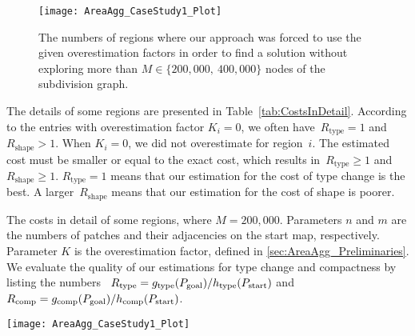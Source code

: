 \begin{figure}[tb]
	\centering
	\texttt{[image: AreaAgg\_CaseStudy1\_Plot]}
	\caption{The numbers of regions where our approach was 
		forced to use the given overestimation factors in order 
		to 
		find a solution without exploring more than $M \in 
		\{200{,}000,~400{,}000\}$ nodes of the subdivision 
		graph.}
	\label{fig:AreaAgg_OverStats}
\end{figure}

The details of some regions are presented in 
Table~\ref{tab:CostsInDetail}.
According to the entries with overestimation factor $K_i=0$, 
we often have~$R_\mathrm{type}=1$ and~$R_\mathrm{shape}>1$.
When $K_i=0$, we did not overestimate for region~$i$.
The estimated cost must be smaller or equal to the exact cost,
which results in~$R_\mathrm{type}\ge 1$ 
and~$R_\mathrm{shape}\ge 1$.
$R_\mathrm{type} = 1$ means that our estimation for the 
cost of type change is the best.
A larger~$R_\mathrm{shape}$ means that our estimation for the 
cost of shape is poorer.

\begin{table*}[tb]
	\caption{The costs in detail of some regions, 
		where $M=200{,}000$.  
		Parameters $n$ and $m$ are the numbers of patches and 
		their adjacencies on the start map, respectively.
		Parameter $K$ is the overestimation factor, 
		defined in \sect\ref{sec:AreaAgg_Preliminaries}. 
		We evaluate the quality 
		of our estimations for type change and 
		compactness by listing the numbers~
		$R_\mathrm{type}=g_\mathrm{type}(P_\mathrm{goal})
		/h_\mathrm{type}(P_\mathrm{start})$ and~
		$R_\mathrm{comp}=g_\mathrm{comp}(P_\mathrm{goal})
		/h_\mathrm{comp}(P_\mathrm{start})$. 
	}
	\label{tab:CostsInDetail}
	\centering
	\texttt{[image: AreaAgg\_CaseStudy1\_Plot]}
\end{table*}


